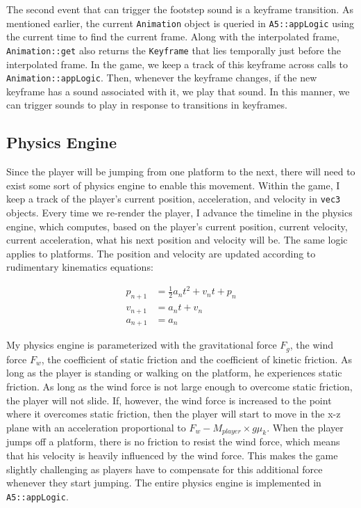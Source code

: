 \documentclass[11pt]{report}
\begin{document}
The second event that can trigger the footstep sound is a keyframe transition. As mentioned earlier, the current \verb|Animation| object is queried in \verb|A5::appLogic| using the current time to find the current frame. Along with the interpolated frame, \verb|Animation::get| also returns the \verb|Keyframe| that lies temporally just before the interpolated frame. In the game, we keep a track of this keyframe across calls to \verb|Animation::appLogic|. Then, whenever the keyframe changes, if the new keyframe has a sound associated with it, we play that sound. In this manner, we can trigger sounds to play in response to transitions in keyframes.

\subsection{Physics Engine}
Since the player will be jumping from one platform to the next, there will need to exist some sort of physics engine to enable this movement. Within the game, I keep a track of the player's current position, acceleration, and velocity in \verb|vec3| objects. Every time we re-render the player, I advance the timeline in the physics engine, which computes, based on the player's current position, current velocity, current acceleration, what his next position and velocity will be. The same logic applies to platforms. The position and velocity are updated according to rudimentary kinematics equations:

\begin{align*}
  p_{n+1} &= \frac{1}{2}a_{n} t^2 + v_{n} t + p_{n} \\
  v_{n+1} &= a_{n} t + v_{n} \\
  a_{n+1} &= a_{n}
\end{align*}

My physics engine is parameterized with the gravitational force $F_g$, the wind force $F_w$, the coefficient of static friction and the coefficient of kinetic friction. As long as the player is standing or walking on the platform, he experiences static friction. As long as the wind force is not large enough to overcome static friction, the player will not slide. If, however, the wind force is increased to the point where it overcomes static friction, then the player will start to move in the x-z plane with an acceleration proportional to $F_w - M_{player} \times g \mu_{k}$. When the player jumps off a platform, there is no friction to resist the wind force, which means that his velocity is heavily influenced by the wind force. This makes the game slightly challenging as players have to compensate for this additional force whenever they start jumping. The entire physics engine is implemented in \verb|A5::appLogic|.
\end{document}
